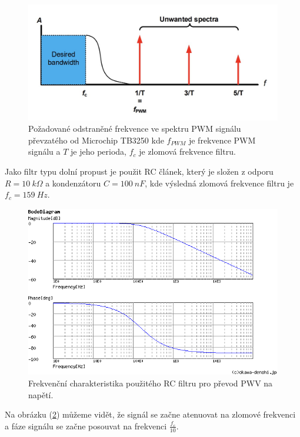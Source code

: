 \begin{figure}[H]
    \centering
    \includegraphics[width=1\linewidth]{pictures/rc_pwm_spectrum_microchip90003250A.jpg}
    \caption{Požadované odstraněné frekvence ve spektru PWM signálu převzatého od Microchip TB3250 kde $f_{PWM}$ je frekvence PWM signálu a $T$ je jeho perioda, $f_{c}$ je zlomová frekvence filtru.\cite{cite:MCPPWV}}
    \label{fig:unwanted_pwm_spectrum}
\end{figure}

Jako filtr typu dolní propust je použit RC článek, který je složen z odporu $R = 10 \ k\Omega$ a kondenzátoru $C = 100 \ nF$, kde výsledná zlomová frekvence filtru je $f_c = 159 \ Hz$.

\begin{figure}[H]
    \centering
    \includegraphics[width=1\linewidth]{pictures/var_rc_filter.png}
    \caption{Frekvenční charakteristika použitého RC filtru pro převod PWV na napětí.\cite{cite:RCResponse}}
    \label{fig:var_rc_filter_char}
\end{figure}

Na obrázku (\ref{fig:var_rc_filter_char}) můžeme vidět, že signál se začne atenuovat na zlomové frekvenci a fáze signálu se začne posouvat na frekvenci $\frac{f_c}{10}$.  \par

